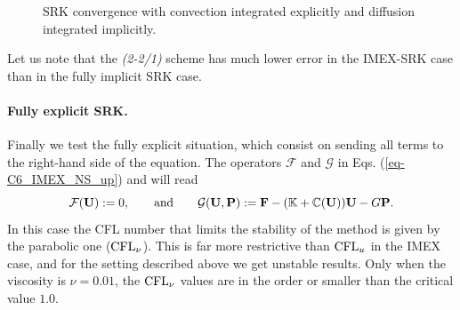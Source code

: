 \begin{figure}[h!]
  \caption{SRK convergence with convection integrated explicitly and diffusion integrated implicitly.}
  \label{fig-IMEX_explcnv_RK_analytical}
\end{figure}
Let us note that the \textit{(2-2/1)} scheme has much lower error in the IMEX-SRK case than in the fully implicit SRK case.

\paragraph{Fully explicit SRK.}

Finally we test the fully explicit situation, which consist on sending all terms to the right-hand side of the equation. The operators $\mathcal{F}$ and $\mathcal{G}$ in  Eqs. (\ref{eq-C6_IMEX_NS_up}) and  will read
$$\mathcal{F}({\bf U}):=0,\quad\quad\mbox{and}\quad\quad\mathcal{G}({\bf U},{\bf P}):={\bf F}-(\mathbb{K}+\mathbb{C}({\bf U})){\bf U}-G{\bf P}.$$
In this case the {CFL} number that limits the stability of the method is given by the parabolic one (${\rm CFL}_\nu$). This is far more restrictive than ${\rm CFL}_u$ in the IMEX case, and for the setting described above we get unstable results. Only when the viscosity is $\nu=0.01$, the ${\rm CFL}_\nu$ values are in the order or smaller than the critical value $1.0$.

